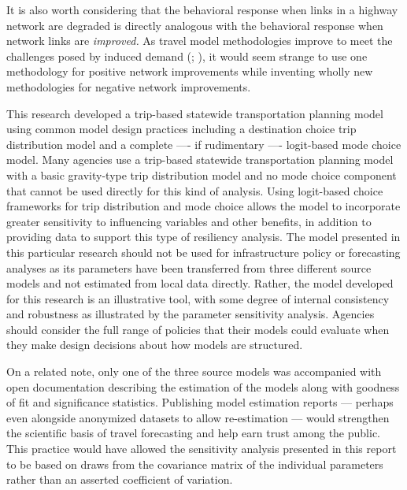 \documentclass[]{ascelike-new}
\begin{document}
It is also worth considering that the behavioral response when links in
a highway network are degraded is directly analogous with the behavioral
response when network links are \emph{improved.} As travel model
methodologies improve to meet the challenges posed by induced demand
(;
), it would seem strange to
use one methodology for positive network improvements while inventing
wholly new methodologies for negative network improvements.

This research developed a trip-based statewide transportation planning
model using common model design practices including a destination choice
trip distribution model and a complete ---- if rudimentary ----
logit-based mode choice model. Many agencies use a trip-based statewide
transportation planning model with a basic gravity-type trip
distribution model and no mode choice component that cannot be used
directly for this kind of analysis. Using logit-based choice frameworks
for trip distribution and mode choice allows the model to incorporate
greater sensitivity to influencing variables and other benefits, in
addition to providing data to support this type of resiliency analysis.
The model presented in this particular research should not be used for
infrastructure policy or forecasting analyses as its parameters have
been transferred from three different source models and not estimated
from local data directly. Rather, the model developed for this research
is an illustrative tool, with some degree of internal consistency and
robustness as illustrated by the parameter sensitivity analysis.
Agencies should consider the full range of policies that their models
could evaluate when they make design decisions about how models are
structured.

On a related note, only one of the three source models was accompanied
with open documentation describing the estimation of the models along
with goodness of fit and significance statistics. Publishing model
estimation reports --- perhaps even alongside anonymized datasets to
allow re-estimation --- would strengthen the scientific basis of travel
forecasting and help earn trust among the public. This practice would
have allowed the sensitivity analysis presented in this report to be
based on draws from the covariance matrix of the individual parameters
rather than an asserted coefficient of variation.
\end{document}
